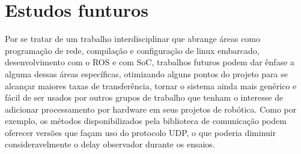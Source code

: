 \chapter{Estudos funturos}\label{cap:trabfut}

Por se tratar de um trabalho interdisciplinar que abrange áreas como programação de rede, compilação e configuração de linux embarcado, desenvolvimento com o ROS e com SoC, trabalhos futuros podem dar ênfase a alguma dessas áreas específicas, otimizando alguns pontos do projeto para se alcançar maiores taxas de transferência, tornar o sistema ainda mais genérico e fácil de ser usados por outros grupos de trabalho que tenham o interesse de adicionar processamento por hardware em seus projetos de robótica. Como por exemplo, os métodos disponibilizados pela biblioteca de comunicação podem oferecer versões que façam uso do protocolo UDP, o que poderia diminuir consideravelmente o delay observador durante os ensaios. 
